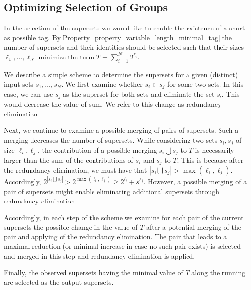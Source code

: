 \subsection{Optimizing Selection of Groups}
In the selection of the supersets we would like to enable the existence of a short as possible tag. By Property~\ref{property_variable_length_minimal_tag} the number of supersets and their identities should be selected such that their sizes $\ell_1, \ldots, \ell_N$ minimize the term $T = \sum_{i = 1}^{N}{2^{\ell_i}}$. 

We describe a simple scheme to determine the supersets for a given (distinct) input sets $s_1, \ldots, s_N$. We first examine whether $s_i \subset s_j$ for some two sets. In this case, we can use $s_j$ as the superset for both sets and eliminate the set $s_i$. This would decrease the value of sum. We refer to this change as redundancy elimination.

Next,  we continue to examine a possible merging of pairs of supersets. Such a merging decreases the number of supersets. While considering two sets $s_i, s_j$ of 
size $\ell_i, \ell_j$, the contribution of  a possible merging $s_i \bigcup s_j$ to $T$ is necessarily larger than  the sum of the contributions of $s_i$ and $s_j$ to $T$.
This is because after the redundancy elimination, we must have that $|s_i \bigcup s_j| > \max(\ell_i, \ell_j)$. Accordingly,  $2^{|s_i \bigcup s_j|} > 2^{\max(\ell_i, \ell_j)} \ge 
2^{\ell_i} + s^{\ell_j}$. However, a possible merging of a pair of supersets might enable eliminating additional supersets through redundancy elimination.

Accordingly, in each step of the scheme we examine for each pair of the current supersets the possible change in the value of $T$ after a potential merging of the pair and applying of the redundancy elimination. The pair that leads to a maximal reduction (or minimal increase in case no such pair exists) is selected and merged in this step and  redundancy elimination is applied. 

Finally,  the observed supersets having the minimal value of $T$ along the running are selected as the output supersets.
 